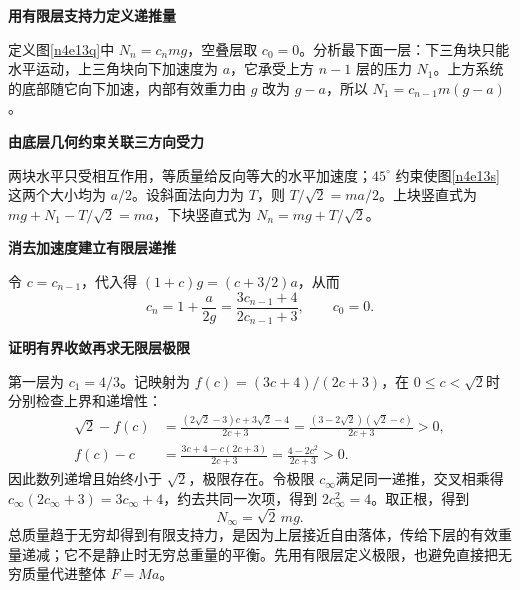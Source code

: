 \begin{solution}\textbf{用有限层支持力定义递推量}\par\nobreak
定义图\ref{n4e13q}中 $N_n=c_nmg$，空叠层取 $c_0=0$。分析最下面一层：下三角块只能水平运动，上三角块向下加速度为 $a$，它承受上方 $n-1$ 层的压力 $N_1$。上方系统的底部随它向下加速，内部有效重力由 $g$ 改为 $g-a$，所以 $N_1=c_{n-1}m(g-a)$。



\par\medskip{}\noindent\textbf{由底层几何约束关联三方向受力}\par\nobreak
两块水平只受相互作用，等质量给反向等大的水平加速度；$45^\circ$ 约束使图\ref{n4e13s}这两个大小均为 $a/2$。设斜面法向力为 $T$，则 $T/\sqrt2=ma/2$。上块竖直式为 $mg+N_1-T/\sqrt2=ma$，下块竖直式为 $N_n=mg+T/\sqrt2$。



\par\medskip{}\noindent\textbf{消去加速度建立有限层递推}\par\nobreak
令 $c=c_{n-1}$，代入得 $(1+c)g=(c+3/2)a$，从而
\[c_n=1+\frac{a}{2g}=\frac{3c_{n-1}+4}{2c_{n-1}+3},\qquad c_0=0.\]


\par\medskip{}\noindent\textbf{证明有界收敛再求无限层极限}\par\nobreak
第一层为 $c_1=4/3$。记映射为 $f(c)=(3c+4)/(2c+3)$，在 $0\le c<\sqrt2$时分别检查上界和递增性：
\begin{align*}
 \sqrt2-f(c)
 &=\frac{(2\sqrt2-3)c+3\sqrt2-4}{2c+3}
 =\frac{(3-2\sqrt2)(\sqrt2-c)}{2c+3}>0,\\
 f(c)-c&=\frac{3c+4-c(2c+3)}{2c+3}
 =\frac{4-2c^2}{2c+3}>0.
\end{align*}
因此数列递增且始终小于 $\sqrt2$，极限存在。令极限 $c_\infty$满足同一递推，交叉相乘得 $c_\infty(2c_\infty+3)=3c_\infty+4$，约去共同一次项，得到 $2c_\infty^2=4$。取正根，得到
\[N_\infty=\sqrt2\,mg.\]
总质量趋于无穷却得到有限支持力，是因为上层接近自由落体，传给下层的有效重量递减；它不是静止时无穷总重量的平衡。先用有限层定义极限，也避免直接把无穷质量代进整体 $F=Ma$。
\end{solution}


